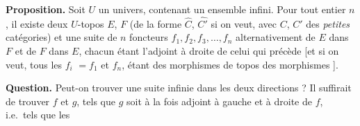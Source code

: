 \documentclass[11pt,a4paper]{article}
\begin{document}
\textbf{Proposition.} Soit $U$ un univers, \struck{\ill{}} contenant un
ensemble infini. Pour tout entier $n$, il existe deux $U$-topos $E$, $F$
(de la forme $\widehat{C}$, $\widehat{C'}$ si on veut, avec $C$, $C'$ des
\emph{petites} catégories) et une
suite de $n$ foncteurs \struck{\ill{}}  $f_{1}, f_{2}, f_{3}, \ldots, f_{n}$
alternativement de $E$ dans $F$ et de $F$ dans $E$, chacun étant l'adjoint à
droite de celui qui précède [et si on veut, tous les $f_{i}$ \ill{}
$= f_{1}$ et $f_{n}$, étant des morphismes de topos \ill{} des morphismes
].

\textbf{Question.} Peut-on trouver une suite infinie dans les deux
directions ? Il suffirait de trouver $f$ et $g$, tels que $g$ soit à la
fois adjoint à gauche et à droite de $f$, i.e.\ tels que les
\end{document}

